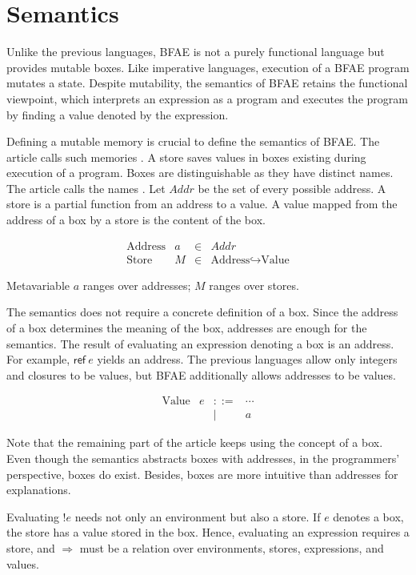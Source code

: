 \section{Semantics
}

Unlike the previous languages, BFAE is not a purely functional language but
provides mutable boxes. Like imperative languages, execution of a BFAE program
mutates a state. Despite mutability, the semantics of BFAE retains the functional
viewpoint, which interprets an expression as a program and executes the program
by finding a value denoted by the expression.

Defining a mutable memory is crucial to define the semantics of BFAE. The article
calls such memories . A store saves values in boxes existing during
execution of a program. Boxes are distinguishable as they have distinct names.
The article calls the names . Let \(Addr\) be the set of every
possible address. A store is a partial function from an address to a value. A
value mapped from the address of a box by a store is the content of the box.

\[
\begin{array}{lrcl}
\text{Address} & a & \in & \mathit{Addr} \\
\text{Store} & M & \in & \text{Address}\hookrightarrow\text{Value}
\end{array}
\]

Metavariable \(a\) ranges over addresses; \(M\) ranges over stores.

The semantics does not require a concrete definition of a box. Since the address
of a box determines the meaning of the box, addresses are enough for the
semantics. The result of evaluating an expression denoting a box is an address.
For example, \(\textsf{ref}\ e\) yields an address. The previous languages allow
only integers and closures to be values, but BFAE additionally allows addresses
to be values.

\[
\begin{array}{lrcl}
\text{Value} & e & ::= & \cdots \\
&& | & a
\end{array}
\]

Note that the remaining part of the article keeps using the concept of a box.
Even though the semantics abstracts boxes with addresses, in the programmers'
perspective, boxes do exist. Besides, boxes are more intuitive than addresses for
explanations.

Evaluating \(!e\) needs not only an environment but also a store. If \(e\)
denotes a box, the store has a value stored in the box. Hence, evaluating an
expression requires a store, and \(\Rightarrow\) must be a relation over
environments, stores, expressions, and values.


